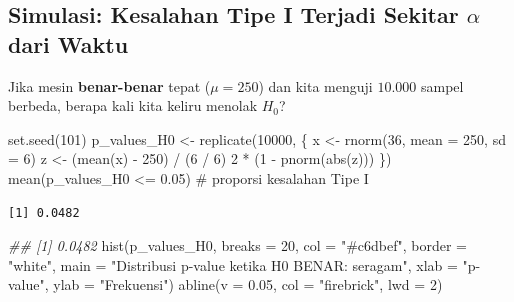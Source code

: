 \documentclass[
  indonesian,
  letterpaper,
]{book}
\newenvironment{Shaded}{\begin{snugshade}}{\end{snugshade}}
\newcommand{\AttributeTok}[1]{\textcolor[rgb]{0.40,0.45,0.13}{#1}}
\newcommand{\CommentTok}[1]{\textcolor[rgb]{0.37,0.37,0.37}{#1}}
\newcommand{\DecValTok}[1]{\textcolor[rgb]{0.68,0.00,0.00}{#1}}
\newcommand{\DocumentationTok}[1]{\textcolor[rgb]{0.37,0.37,0.37}{\textit{#1}}}
\newcommand{\FloatTok}[1]{\textcolor[rgb]{0.68,0.00,0.00}{#1}}
\newcommand{\FunctionTok}[1]{\textcolor[rgb]{0.28,0.35,0.67}{#1}}
\newcommand{\NormalTok}[1]{\textcolor[rgb]{0.00,0.23,0.31}{#1}}
\newcommand{\OtherTok}[1]{\textcolor[rgb]{0.00,0.23,0.31}{#1}}
\newcommand{\SpecialCharTok}[1]{\textcolor[rgb]{0.37,0.37,0.37}{#1}}
\newcommand{\StringTok}[1]{\textcolor[rgb]{0.13,0.47,0.30}{#1}}
\begin{document}
\subsection{\texorpdfstring{Simulasi: Kesalahan Tipe I Terjadi Sekitar
\(\alpha\) dari
Waktu}{Simulasi: Kesalahan Tipe I Terjadi Sekitar \textbackslash alpha dari Waktu}}\label{simulasi-kesalahan-tipe-i-terjadi-sekitar-alpha-dari-waktu}

Jika mesin \textbf{benar-benar} tepat (\(\mu = 250\)) dan kita menguji
\(10.000\) sampel berbeda, berapa kali kita keliru menolak \(H_0\)?

\begin{Shaded}
\begin{Highlighting}[]
\FunctionTok{set.seed}\NormalTok{(}\DecValTok{101}\NormalTok{)}
\NormalTok{p\_values\_H0 }\OtherTok{\textless{}{-}} \FunctionTok{replicate}\NormalTok{(}\DecValTok{10000}\NormalTok{, \{}
\NormalTok{x }\OtherTok{\textless{}{-}} \FunctionTok{rnorm}\NormalTok{(}\DecValTok{36}\NormalTok{, }\AttributeTok{mean =} \DecValTok{250}\NormalTok{, }\AttributeTok{sd =} \DecValTok{6}\NormalTok{)}
\NormalTok{z }\OtherTok{\textless{}{-}}\NormalTok{ (}\FunctionTok{mean}\NormalTok{(x) }\SpecialCharTok{{-}} \DecValTok{250}\NormalTok{) }\SpecialCharTok{/}\NormalTok{ (}\DecValTok{6} \SpecialCharTok{/} \DecValTok{6}\NormalTok{)}
\DecValTok{2} \SpecialCharTok{*}\NormalTok{ (}\DecValTok{1} \SpecialCharTok{{-}} \FunctionTok{pnorm}\NormalTok{(}\FunctionTok{abs}\NormalTok{(z)))}
\NormalTok{\})}
\FunctionTok{mean}\NormalTok{(p\_values\_H0 }\SpecialCharTok{\textless{}=} \FloatTok{0.05}\NormalTok{) }\CommentTok{\# proporsi kesalahan Tipe I}
\end{Highlighting}
\end{Shaded}

\begin{verbatim}
[1] 0.0482
\end{verbatim}

\begin{Shaded}
\begin{Highlighting}[]
\DocumentationTok{\#\# [1] 0.0482}
\FunctionTok{hist}\NormalTok{(p\_values\_H0, }\AttributeTok{breaks =} \DecValTok{20}\NormalTok{, }\AttributeTok{col =} \StringTok{"\#c6dbef"}\NormalTok{, }\AttributeTok{border =} \StringTok{"white"}\NormalTok{,}
\AttributeTok{main =} \StringTok{"Distribusi p{-}value ketika H0 BENAR: seragam"}\NormalTok{, }\AttributeTok{xlab =} \StringTok{"p{-}value"}\NormalTok{, ylab}
\OtherTok{=} \StringTok{"Frekuensi"}\NormalTok{)}
\FunctionTok{abline}\NormalTok{(}\AttributeTok{v =} \FloatTok{0.05}\NormalTok{, }\AttributeTok{col =} \StringTok{"firebrick"}\NormalTok{, }\AttributeTok{lwd =} \DecValTok{2}\NormalTok{)}
\end{Highlighting}
\end{Shaded}
\end{document}
